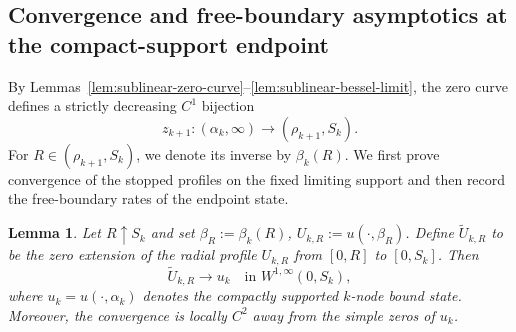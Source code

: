 \documentclass[11pt]{article}
\newtheorem{lemma}[theorem]{Lemma}
\begin{document}
\subsection{\texorpdfstring{{Convergence and free-boundary asymptotics at the compact-support endpoint}}{Convergence and free-boundary asymptotics at the compact-support endpoint}}


By Lemmas~\ref{lem:sublinear-zero-curve}--\ref{lem:sublinear-bessel-limit}, the zero curve defines a strictly
decreasing $C^1$ bijection
\[
z_{k+1}:(\alpha_k,\infty)
\longrightarrow(\rho_{k+1},S_k).
\]
For $R\in(\rho_{k+1},S_k)$, we denote its inverse by
$\beta_k(R)$.  {We first prove convergence of the stopped profiles on the
fixed limiting support and then record the free-boundary rates of the endpoint
state.}

\begin{lemma}
\label{lem:sublinear-state-convergence}
Let $R\uparrow S_k$ and set $\beta_R:=\beta_k(R)$,
$U_{k,R}:=u(\cdot,\beta_R)$. Define $\widetilde U_{k,R}$ to be the zero extension of the
{radial profile} $U_{k,R}$ from {$[0,R]$ to $[0,S_k]$}.
Then
\begin{equation}
 \widetilde U_{k,R}\longrightarrow u_k
 \quad\text{in }W^{1,\infty}(0,S_k),
 \label{eq:sub-W1infty}
\end{equation}
where $u_k=u(\cdot,\alpha_k)$ denotes the compactly supported
\(k\)-node bound state.
Moreover, the convergence is locally $C^2$ away from the
simple zeros of $u_k$.
\end{lemma}
\end{document}
